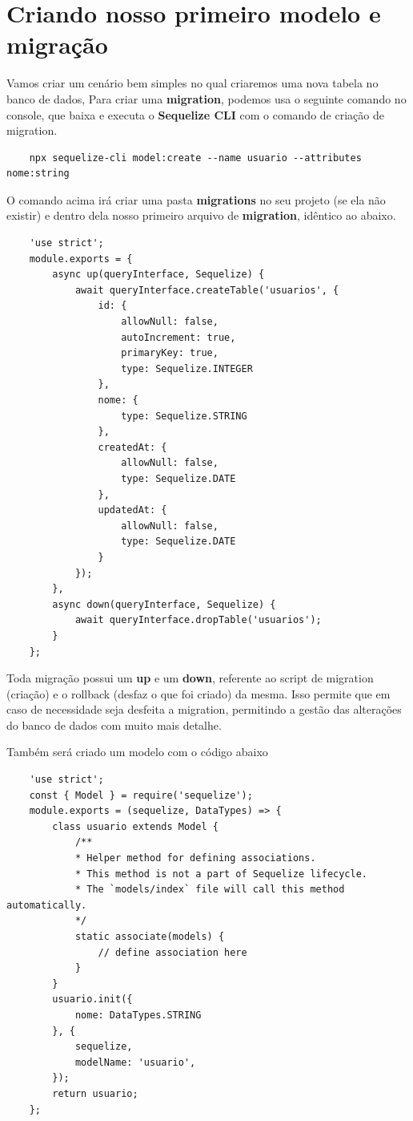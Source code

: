 \section{Criando nosso primeiro modelo e migração}

Vamos criar um cenário bem simples no qual criaremos uma nova tabela no banco de dados, Para criar uma \textbf{migration}, podemos usa o seguinte comando no console, que baixa e executa o \textbf{Sequelize CLI} com o comando de criação de migration.

\begin{verbatim}
	npx sequelize-cli model:create --name usuario --attributes nome:string
\end{verbatim}

O comando acima irá criar uma pasta \textbf{migrations} no seu projeto (se ela não existir) e dentro dela nosso primeiro arquivo de \textbf{migration}, idêntico ao abaixo.

\begin{verbatim}
	'use strict';
	module.exports = {
		async up(queryInterface, Sequelize) {
			await queryInterface.createTable('usuarios', {
				id: {
					allowNull: false,
					autoIncrement: true,
					primaryKey: true,
					type: Sequelize.INTEGER
				},
				nome: {
					type: Sequelize.STRING
				},
				createdAt: {
					allowNull: false,
					type: Sequelize.DATE
				},
				updatedAt: {
					allowNull: false,
					type: Sequelize.DATE
				}
			});
		},
		async down(queryInterface, Sequelize) {
			await queryInterface.dropTable('usuarios');
		}
	};
\end{verbatim}

Toda migração possui um \textbf{up} e um \textbf{down}, referente ao script de migration (criação) e o rollback (desfaz o que foi criado) da mesma. Isso permite que em caso de necessidade seja desfeita a migration, permitindo a gestão das alterações do banco de dados com muito mais detalhe.

Também será criado um modelo com o código abaixo

\begin{verbatim}
	'use strict';
	const { Model } = require('sequelize');
	module.exports = (sequelize, DataTypes) => {
		class usuario extends Model {
			/**
			* Helper method for defining associations.
			* This method is not a part of Sequelize lifecycle.
			* The `models/index` file will call this method automatically.
			*/
			static associate(models) {
				// define association here
			}
		}
		usuario.init({
			nome: DataTypes.STRING
		}, {
			sequelize,
			modelName: 'usuario',
		});
		return usuario;
	};
\end{verbatim}

